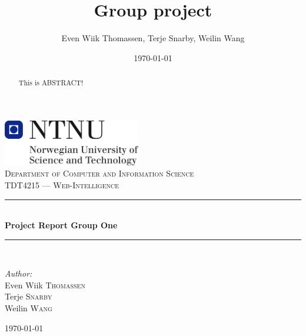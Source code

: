 \documentclass[11pt,a4paper]{report}
\title{Group project}
\author{Even Wiik Thomassen, Terje Snarby, Weilin Wang}
\date{\today}
\begin{document}
\begin{titlepage}
\begin{center}
\includegraphics[width=0.45\textwidth]{./img/NTNU-logo.png}\\[5cm]
\textsc{\large Department of Computer and Information Science}\\[0.2cm]
\textsc{\Large TDT4215 --- Web-Intelligence}\\[0.5cm]

\rule{\linewidth}{0.2mm} \\[0.4cm]
{ \LARGE \bfseries Project Report Group One}\\[0.2cm]
\rule{\linewidth}{0.2mm} \\[1.5cm]

\begin{minipage}{0.4\textwidth}
\begin{flushleft} \large
\emph{Author:}\\
Even Wiik \textsc{Thomassen}\\
Terje \textsc{Snarby}\\
Weilin \textsc{Wang}
\end{flushleft}
\end{minipage}

\vfill
{\large \today}
\end{center}
\end{titlepage}


\begin{abstract}
This is ABSTRACT!
\end{abstract}


\clearpage
{}
{}
\tableofcontents






\clearpage
{}
\end{document}
